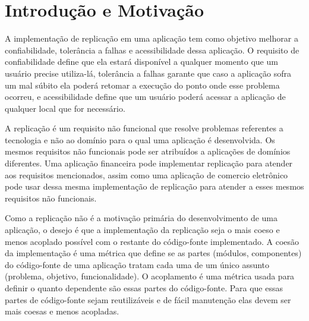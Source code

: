\documentclass[12pt]{article}
\begin{document}
\section{Introdução e Motivação} 

A implementação de replicação em uma aplicação tem como objetivo melhorar a 
confiabilidade, tolerância a falhas e acessibilidade dessa aplicação.
O requisito de confiabilidade define que ela estará disponível a 
qualquer momento que um usuário precise utiliza-lá, tolerância a falhas garante 
que caso a aplicação sofra um mal súbito ela poderá retomar a execução do ponto 
onde esse problema ocorreu, e acessibilidade define que um usuário poderá acessar 
a aplicação de qualquer local que for necessário. 

A replicação é um requisito não funcional que resolve problemas referentes
a tecnologia e não ao domínio para o qual uma aplicação é desenvolvida. Os mesmos 
requisitos não funcionais pode ser atribuídos a aplicações de domínios diferentes.
Uma aplicação financeira pode implementar replicação para atender aos requisitos
mencionados, assim como uma aplicação de comercio eletrônico pode usar dessa
mesma implementação de replicação para atender a esses mesmos requisitos não
funcionais.  
 
Como a replicação não é a motivação primária do desenvolvimento de uma aplicação,
o desejo é que a implementação da replicação seja o mais coeso e menos acoplado 
possível com o restante do código-fonte implementado. A coesão da implementação
é uma métrica que define se as partes (módulos, componentes) do código-fonte de 
uma aplicação tratam cada uma de um único assunto (problema, objetivo, funcionalidade). 
O acoplamento é uma métrica usada para definir o quanto dependente são essas partes 
do código-fonte. Para que essas partes de código-fonte sejam reutilizáveis e de 
fácil manutenção elas devem ser mais coesas e menos acopladas.
\end{document}
